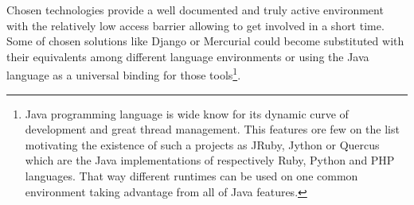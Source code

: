 Chosen technologies provide a well documented and truly active environment with the relatively low access barrier allowing to get involved in a short time. Some of chosen solutions like Django or Mercurial could become substituted with their equivalents among different language environments or using the Java language as a universal binding for those tools\footnote{Java programming language is wide know for its dynamic curve of development and great thread management. This features ore few on the list motivating the existence of such a projects as JRuby, Jython or Quercus which are the Java implementations of respectively  Ruby, Python and PHP languages. That way different runtimes can be used on one common environment taking advantage from all of Java features.}.       
\begin{figure}[ht]
  \begin{center}

\end{center}
\end{figure}
